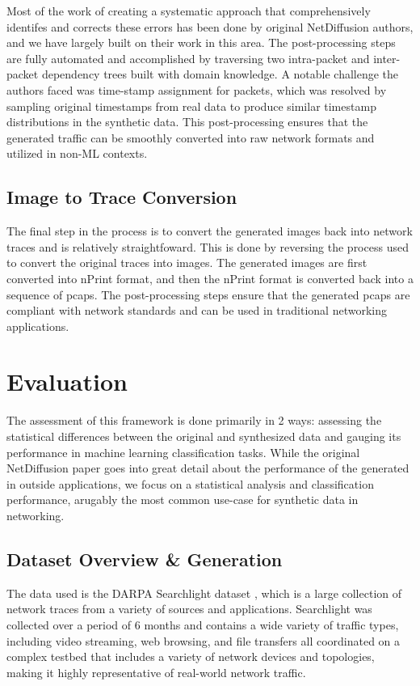 \documentclass[sigconf, nonacm]{acmart}
\begin{document}
Most of the work of creating a systematic approach that comprehensively 
identifes and corrects these errors has been done by original 
NetDiffusion authors, and we have largely built on their work in this
area. The post-processing steps are fully automated and accomplished
by traversing two intra-packet and inter-packet dependency trees built
with domain knowledge. A notable challenge the authors faced was
time-stamp assignment for packets, which was resolved by sampling 
original timestamps from real data to produce similar timestamp distributions
in the synthetic data. This post-processing ensures that the generated
traffic can be smoothly converted into raw network formats and utilized
in non-ML contexts.

\subsection{Image to Trace Conversion}
The final step in the process is to convert the generated images back
into network traces and is relatively straightfoward.
This is done by reversing the process used to convert
the original traces into images. The generated images are first converted
into nPrint format, and then the nPrint format is converted back into
a sequence of pcaps. The post-processing steps ensure that the generated
pcaps are compliant with network standards and can be used in traditional
networking applications.

\section{Evaluation}
The assessment of this framework is done primarily in 2 ways: assessing
the statistical differences between the original and synthesized data and
gauging its performance
in machine learning classification tasks. While the original NetDiffusion paper
goes into great detail about the performance of the generated in outside
applications, we focus on a statistical analysis and classification performance,
arugably the most common use-case for synthetic data in networking.

\subsection{Dataset Overview \& Generation}
The data used is the DARPA Searchlight dataset \cite{ardi2022}, which is a large
collection of network traces from a variety of sources and applications. Searchlight
was collected over a period of 6 months and contains a wide variety of traffic types,
including video streaming, web browsing, and file transfers all coordinated on a 
complex testbed that includes a variety of network devices and topologies, making it
highly representative of real-world network traffic. 
\end{document}
